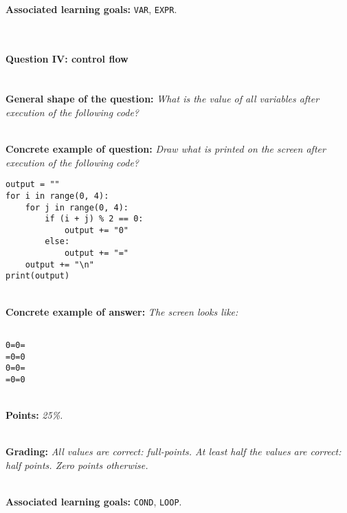\ \\ 

\textbf{Associated learning goals:} \texttt{VAR}, \texttt{EXPR}.

\ \\ 

\paragraph{Question IV: control flow}

\ \\ 

\textbf{General shape of the question:} \textit{What is the value of all variables after execution of the following code?}

\ \\ 

\textbf{Concrete example of question:} \textit{Draw what is printed on the screen after execution of the following code?}

\begin{lstlisting}
output = ""
for i in range(0, 4):
    for j in range(0, 4):
        if (i + j) % 2 == 0:
            output += "0"
        else:
            output += "="
    output += "\n"
print(output)
\end{lstlisting}

\ \\ 

\textbf{Concrete example of answer:} \textit{The screen looks like:}
\begin{lstlisting}

0=0=
=0=0
0=0=
=0=0

\end{lstlisting}

\ \\ 

\textbf{Points:} \textit{25\%.}

\ \\ 

\textbf{Grading:} \textit{All values are correct: full-points. At least half the values are correct: half points. Zero points otherwise.}

\ \\ 

\textbf{Associated learning goals:} \texttt{COND}, \texttt{LOOP}.

\ \\ 
